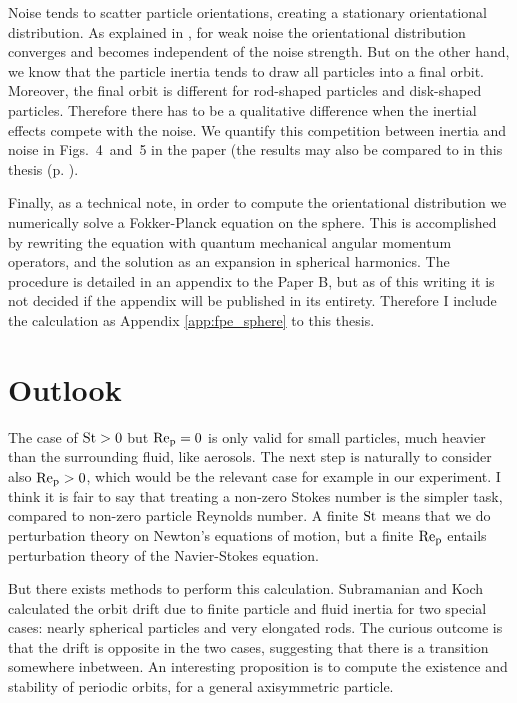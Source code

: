 \documentclass[thesis.tex]{subfiles}
\begin{document}
Noise tends to scatter particle orientations, creating a stationary orientational distribution. As explained in , for weak noise the orientational distribution converges and becomes independent of the noise strength. But on the other hand, we know that the particle inertia tends to draw all particles into a final orbit. Moreover, the final orbit is different for rod-shaped particles and disk-shaped particles. Therefore there has to be a qualitative difference when the inertial effects compete with the noise. We quantify this competition between inertia and noise in Figs.~4~and~5 in the paper (the results may also be compared to  in this thesis (p. \pageref{fig:sintheta1}).

Finally, as a technical note, in order to compute the orientational distribution we numerically solve a Fokker-Planck equation on the sphere. This is accomplished by rewriting the equation with quantum mechanical angular momentum operators, and the solution as an expansion in spherical harmonics. The procedure is detailed in an appendix to the Paper B, but as of this writing it is not decided if the appendix will be published in its entirety. Therefore I include the calculation as Appendix \ref{app:fpe_sphere} to this thesis.

\section{Outlook}

The case of $\mbox{St}>0$ but $\mbox{Re}_{\mathrm p}=0$ is only valid for small particles, much heavier than the surrounding fluid, like aerosols. The next step is naturally to consider also $\mbox{Re}_{\mathrm p} > 0$, which would be the relevant case for example in our experiment. I think it is fair to say that treating a non-zero Stokes number is the simpler task, compared to non-zero particle Reynolds number. A finite $\mbox{St}$ means that we do perturbation theory on Newton's equations of motion, but a finite $\mbox{Re}_{\mathrm p}$ entails perturbation theory of the Navier-Stokes equation.

But there exists methods to perform this calculation. Subramanian and Koch \cite{sub05,sub06} calculated the orbit drift due to finite particle and fluid inertia for two special cases: nearly spherical particles and very elongated rods. The curious outcome is that the drift is opposite in the two cases, suggesting that there is a transition somewhere inbetween. An interesting proposition is to compute the existence and stability of periodic orbits, for a general axisymmetric particle. 
\end{document}
